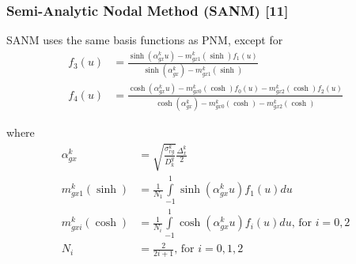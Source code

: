 \documentclass{beamer}
\begin{document}

\begin{frame}
\frametitle{Semi-Analytic Nodal Method (SANM) [11]}
\begin{block}{SANM uses the same basis functions as PNM, except for}
    \begin{equation*}
      \begin{split}
        \scriptscriptstyle {f_3}(u) &{\scriptscriptstyle =} \scriptscriptstyle \frac{\sinh \left(\alpha_{gx}^k u \right) - m_{gx1}^k(\sinh)f_1(u)}{\sinh \left(\alpha_{gx}^k \right) - m_{gx1}^k(\sinh)} \\
        \scriptscriptstyle {f_4}(u) &{\scriptscriptstyle =} \scriptscriptstyle \frac{\cosh \left(\alpha_{gx}^k u \right) - m_{gx0}^k(\cosh)f_0(u) - m_{gx2}^k(\cosh)f_2(u)}{\cosh \left(\alpha_{gx}^k \right) - m_{gx0}^k(\cosh) - m_{gx2}^k(\cosh)}
      \end{split}
    \end{equation*}
\end{block}
\begin{block}{where}
    \begin{equation*}
      \begin{split}
        \scriptscriptstyle \alpha_{gx}^k &{\scriptscriptstyle =} \scriptscriptstyle \sqrt{\frac{\sigma_{rg}^k}{D_k^g}}\frac{\Delta _x^k}{2} \\
        \scriptscriptstyle m_{gx1}^k(\sinh) &{\scriptscriptstyle =} \scriptscriptstyle \frac{1}{N_1}\int\limits_{-1}^{1} \sinh \left(\alpha_{gx}^k u \right) f_1(u) du \\
        \scriptscriptstyle m_{gxi}^k(\cosh) &{\scriptscriptstyle =} \scriptscriptstyle \frac{1}{N_i}\int\limits_{-1}^{1} \cosh \left(\alpha_{gx}^k u \right) f_i(u) du \text{, for } i=0,2 \\
        \scriptscriptstyle N_i &{\scriptscriptstyle =} \scriptscriptstyle \frac{2}{2i+1} \text{, for } i=0,1, 2
      \end{split}
    \end{equation*}
\end{block}
\end{frame}

\end{document}
